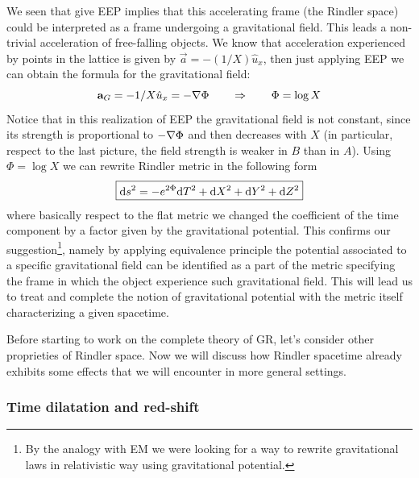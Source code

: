 \documentclass[../main/main.tex]{subfiles}
\begin{document}
We seen that give EEP implies that this accelerating frame (the Rindler space) could be interpreted as a frame undergoing a gravitational field. This leads a non-trivial acceleration of free-falling objects. We know that acceleration experienced by points in the lattice is given by $\vec a=-(1/X)\hat u_x$, then just applying EEP we can obtain the formula for the gravitational field: 
\[\vec a_G=-1/X\hat u_x=-\vect\nabla\Phi\qquad\Rightarrow\qquad\Phi=\log X\]
Notice that in this realization of EEP the gravitational field is not constant, since its strength is proportional to $-\vect\nabla\Phi$ and then decreases with $X$ (in particular, respect to the last picture, the field strength is weaker in $B$ than in $A$). Using $\Phi=\log X$ we can rewrite Rindler metric in the following form
\begin{equation}\boxed{
\textup{d} s^2=-e^{2\Phi}\textup{d} T^2+\textup{d} X^2+\textup{d} Y^2+\textup{d} Z^2
}\end{equation}
where basically respect to the flat metric we changed the coefficient of the time component by a factor given by the gravitational potential. This confirms our suggestion\footnote{By the analogy with EM we were looking for a way to rewrite gravitational laws in relativistic way using gravitational potential.}, namely by applying equivalence principle the potential associated to a specific gravitational field can be identified as a part of the metric specifying the frame in which the object experience such gravitational field. 
This will lead us to treat and complete the notion of gravitational potential with the metric itself characterizing a given spacetime. 

Before starting to work on the complete theory of GR, let's consider other proprieties of Rindler space. 
Now we will discuss how Rindler spacetime already exhibits some effects that we will encounter in more general settings. 

\subsubsection{Time dilatation and red-shift}
\end{document}

